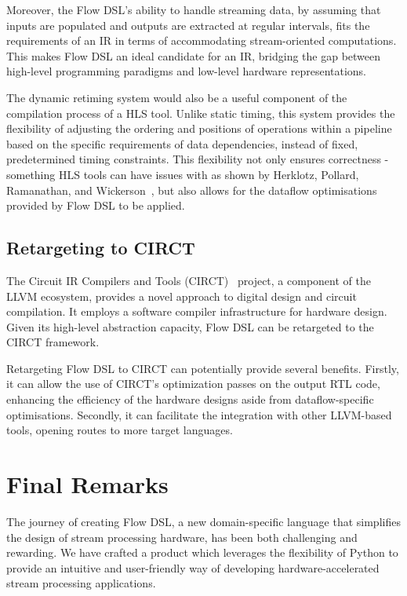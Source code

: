 Moreover, the Flow DSL's ability to handle streaming data, by assuming that inputs are populated and outputs are extracted at regular intervals, fits the requirements of an IR in terms of accommodating stream-oriented computations. This makes Flow DSL an ideal candidate for an IR, bridging the gap between high-level programming paradigms and low-level hardware representations.

The dynamic retiming system would also be a useful component of the compilation process of a HLS tool. Unlike static timing, this system provides the flexibility of adjusting the ordering and positions of operations within a pipeline based on the specific requirements of data dependencies, instead of fixed, predetermined timing constraints. This flexibility not only ensures correctness \hyphen{} something HLS tools can have issues with as shown by Herklotz, Pollard, Ramanathan, and Wickerson \cite{formal_verif}, but also allows for the dataflow optimisations provided by Flow DSL to be applied.

\subsection{Retargeting to CIRCT}
The Circuit IR Compilers and Tools (CIRCT) \cite{circt} project, a component of the LLVM ecosystem, provides a novel approach to digital design and circuit compilation. It employs a software compiler infrastructure for hardware design. Given its high-level abstraction capacity, Flow DSL can be retargeted to the CIRCT framework.

Retargeting Flow DSL to CIRCT can potentially provide several benefits. Firstly, it can allow the use of CIRCT's optimization passes on the output RTL code, enhancing the efficiency of the hardware designs aside from dataflow-specific optimisations. Secondly, it can facilitate the integration with other LLVM-based tools, opening routes to more target languages.

\section{Final Remarks}
The journey of creating Flow DSL, a new domain-specific language that simplifies the design of stream processing hardware, has been both challenging and rewarding. We have crafted a product which leverages the flexibility of Python to provide an intuitive and user-friendly way of developing hardware-accelerated stream processing applications.


